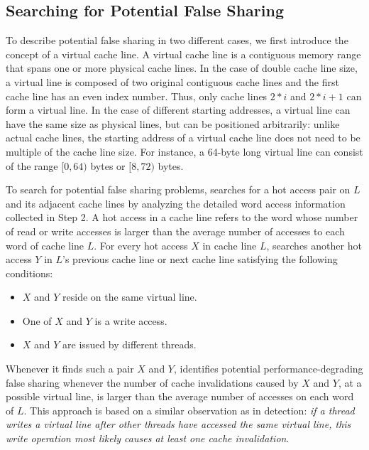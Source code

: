 \subsection{Searching for Potential False Sharing}
\label{sec:evaluatingfs}
To describe potential false sharing in two different cases, we first 
introduce the concept of a virtual cache line.  A virtual cache line
is a contiguous memory range that spans one or more physical cache 
lines.  In the case of double cache line size, a virtual line is
composed of two original contiguous cache lines and the first cache
line has an even index number.  Thus, only cache lines $2*i$ and
$2*i+1$ can form a virtual line.  In the case of different starting
addresses, a virtual line can have the same size as physical lines,
but can be positioned arbitrarily: unlike actual cache lines, the
starting address of a virtual cache line does not need to be multiple
of the cache line size.  For instance, a 64-byte long virtual line can
consist of the range $[0,64)$ bytes or $[8,72)$ bytes.

To search for potential false sharing problems, 
\Predator{} searches for a hot access pair on $L$ and its adjacent cache lines 
by analyzing the detailed word access information collected in Step 2. 
A hot access in a cache line refers to the word whose number of read or write accesses 
is larger than the average number of accesses to each word of cache line $L$.
For every hot access $X$ in cache line $L$, \Predator{} searches another
hot access $Y$ in $L$'s previous cache line or next cache line satisfying
the following conditions: 

\begin{itemize}
\item
$X$ and $Y$ reside on the same virtual line. 

\item
One of $X$ and $Y$ is a write access.

\item 
$X$ and $Y$ are issued by different threads.

\end{itemize}

Whenever it finds such a pair $X$ and $Y$, 
\Predator{} identifies potential performance-degrading false sharing whenever
 the number of cache invalidations caused by $X$ and $Y$, at a possible virtual line, 
is larger than the average number of accesses on each word of $L$. 
This approach is based on a similar observation as in detection:
\emph{if a thread writes a virtual line after other threads 
have accessed the same virtual line, this write operation most likely causes at least one cache 
invalidation}. 

